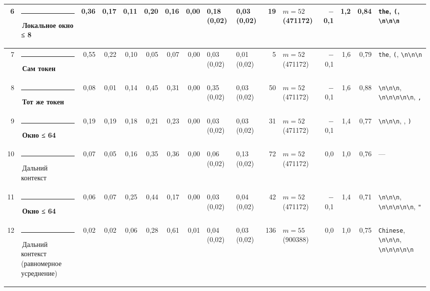 \documentclass[10pt]{article}
\begin{document}
\begin{minipage}{\linewidth}
\begin{center}
{\begin{tabular}{|r|l|r|r|r|r|r|r|l|l|r|l|r|r|r|l|}
6 & \textcolor[HTML]{1BAF7A}{\rule{0.62em}{0.62em}}\,\textbf{Локальное окно ≤ 8} & 0,36 & 0,17 & 0,11 & 0,20 & 0,16 & 0,00 & 0,18 (0,02) & 0,03 (0,02) & 19 & $m{=}52$ (471172) & $-$0,1 & 1,2 & 0,84 & \texttt{\textvisiblespace{}the}, \texttt{\textvisiblespace{}(}, \texttt{\textvisiblespace{}\textbackslash{}n\textbackslash{}n\textbackslash{}n} \\ \hline
7 & \textcolor[HTML]{2A78D6}{\rule{0.62em}{0.62em}}\,\textbf{Сам токен} & 0,55 & 0,22 & 0,10 & 0,05 & 0,07 & 0,00 & 0,03 (0,02) & 0,01 (0,02) & 5 & $m{=}52$ (471172) & $-$0,1 & 1,6 & 0,79 & \texttt{\textvisiblespace{}the}, \texttt{\textvisiblespace{}(}, \texttt{\textvisiblespace{}\textbackslash{}n\textbackslash{}n\textbackslash{}n} \\ \hline
8 & \textcolor[HTML]{E87BA4}{\rule{0.62em}{0.62em}}\,\textbf{Тот же токен} & 0,08 & 0,01 & 0,14 & 0,45 & 0,31 & 0,00 & 0,35 (0,02) & 0,03 (0,02) & 50 & $m{=}52$ (471172) & $-$0,1 & 1,6 & 0,88 & \texttt{\textvisiblespace{}\textbackslash{}n\textbackslash{}n\textbackslash{}n}, \texttt{\textvisiblespace{}\textbackslash{}n\textbackslash{}n\textbackslash{}n\textbackslash{}n\textbackslash{}n}, \texttt{\textvisiblespace{},} \\ \hline
9 & \textcolor[HTML]{EDA100}{\rule{0.62em}{0.62em}}\,\textbf{Окно ≤ 64} & 0,19 & 0,19 & 0,18 & 0,21 & 0,23 & 0,00 & 0,03 (0,02) & 0,03 (0,02) & 31 & $m{=}52$ (471172) & $-$0,1 & 1,4 & 0,77 & \texttt{\textvisiblespace{}\textbackslash{}n\textbackslash{}n\textbackslash{}n}, \texttt{\textvisiblespace{}}, \texttt{\textvisiblespace{})} \\ \hline
10 & \textcolor[HTML]{C3C2B7}{\rule{0.62em}{0.62em}}\,Дальний контекст & 0,07 & 0,05 & 0,16 & 0,35 & 0,36 & 0,00 & 0,06 (0,02) & 0,13 (0,02) & 72 & $m{=}52$ (471172) & 0,0 & 1,0 & 0,76 & — \\ \hline
11 & \textcolor[HTML]{EDA100}{\rule{0.62em}{0.62em}}\,\textbf{Окно ≤ 64} & 0,06 & 0,07 & 0,25 & 0,44 & 0,17 & 0,00 & 0,03 (0,02) & 0,04 (0,02) & 42 & $m{=}52$ (471172) & $-$0,1 & 1,4 & 0,71 & \texttt{\textvisiblespace{}\textbackslash{}n\textbackslash{}n\textbackslash{}n}, \texttt{\textvisiblespace{}\textbackslash{}n\textbackslash{}n\textbackslash{}n\textbackslash{}n\textbackslash{}n}, \texttt{\textvisiblespace{}"} \\ \hline
12 & \textcolor[HTML]{C3C2B7}{\rule{0.62em}{0.62em}}\,Дальний контекст (равномерное усреднение) & 0,02 & 0,02 & 0,06 & 0,28 & 0,61 & 0,01 & 0,04 (0,02) & 0,03 (0,02) & 136 & $m{=}55$ (900388) & 0,0 & 1,0 & 0,75 & \texttt{\textvisiblespace{}Chinese}, \texttt{\textvisiblespace{}\textbackslash{}n\textbackslash{}n\textbackslash{}n}, \texttt{\textvisiblespace{}\textbackslash{}n\textbackslash{}n\textbackslash{}n\textbackslash{}n\textbackslash{}n} \\ \hline

\end{tabular}}
\end{center}
\end{minipage}
\end{document}
